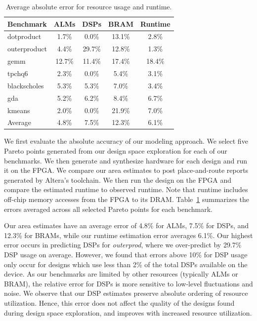 \begin{table}
\centering\footnotesize
\begin{tabular}{lcccc}
\toprule

{\bf Benchmark} & {\bf ALMs} & {\bf DSPs} & {\bf BRAM} & {\bf Runtime} \\ \midrule
dotproduct      & 1.7\%      & 0.0\%      & 13.1\%      & 2.8\%  \\ \midrule
outerproduct    & 4.4\%      & 29.7\%     & 12.8\%      & 1.3\%  \\ \midrule
gemm            & 12.7\%     & 11.4\%     & 17.4\%      & 18.4\% \\ \midrule
tpchq6          & 2.3\%      & 0.0\%      & 5.4\%       & 3.1\%  \\ \midrule
blackscholes    & 5.3\%      & 5.3\%      & 7.0\%       & 3.4\%  \\ \midrule
gda             & 5.2\%      & 6.2\%      & 8.4\%       & 6.7\%  \\ \midrule
kmeans          & 2.0\%      & 0.0\%      & 21.9\%      & 7.0\%  \\ \midrule \midrule

Average         & 4.8\%      & 7.5\%     & 12.3\%      & 6.1\%   \\ \bottomrule
\end{tabular}
\caption{Average absolute error for resource usage and runtime.}
\label{t:errors}
\end{table}

We first evaluate the absolute accuracy of our modeling approach. We select five Pareto points generated from our design space exploration for each of our benchmarks. We then generate and synthesize hardware for each design and run it on the FPGA. We compare our area estimates to post place-and-route reports generated by Altera's toolchain. We then run the design on the FPGA and compare the estimated runtime to observed runtime. Note that runtime includes off-chip memory accesses from the FPGA to its DRAM. Table~\ref{t:errors} summarizes the errors averaged across all selected Pareto points for each benchmark.

Our area estimates have an average error of 4.8\% for ALMs, 7.5\% for DSPs, and 12.3\% for BRAMs, while our runtime estimation error averages 6.1\%.
Our highest error occurs in predicting DSPs for \emph{outerprod}, where we over-predict by 29.7\% DSP usage on average.
However, we found that errors above 10\% for DSP usage only occur for designs which use less than 2\% of the total DSPs available on the device.
As our benchmarks are limited by other resources (typically ALMs or BRAM), the relative error for DSPs is more sensitive
to low-level fluctuations and noise. We observe that our DSP estimates preserve absolute ordering of resource utilization. Hence, this error does not
affect the quality of the designs found during design space exploration, and improves with increased resource utilization.


